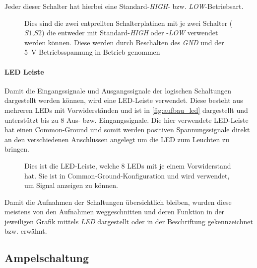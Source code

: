 \documentclass[12pt,english,ngerman]{scrartcl}
\begin{document}
Jeder dieser Schalter hat hierbei eine Standard-\textit{HIGH}- bzw.
\textit{LOW}-Betriebsart.

\begin{figure}[H]
  \centering
  \caption{Dies sind die zwei entprellten Schalterplatinen mit je zwei Schalter
    ($S1$,$S2$) die entweder mit Standard-\textit{HIGH} oder -\textit{LOW} verwendet
    werden können. Diese werden durch Beschalten des \textit{GND} und der \SI{5}{\volt}
    Betriebsspannung in Betrieb genommen}
  \label{fig:aufbau_schalter}
\end{figure}


\paragraph{LED Leiste}
Damit die Eingangssignale und Ausgangssignale der logischen Schaltungen
dargestellt werden können, wird eine LED-Leiste verwendet. Diese besteht aus
mehreren LEDs mit Vorwiderständen und ist in \autoref{fig:aufbau_led} dargestellt und
unterstützt bis zu 8 Aus- bzw. Eingangssignale. Die hier verwendete LED-Leiste
hat einen Common-Ground und somit werden positiven Spannungssignale direkt an den
verschiedenen Anschlüssen angelegt um die LED zum Leuchten zu bringen.

\begin{figure}[H]
  \centering
  \caption{Dies ist die LED-Leiste, welche 8 LEDs mit je einem Vorwiderstand
  hat. Sie ist in Common-Ground-Konfiguration und wird verwendet, um Signal
  anzeigen zu können.}
  \label{fig:aufbau_led}
\end{figure}

Damit die Aufnahmen der Schaltungen übersichtlich bleiben, wurden diese meistens
von den Aufnahmen weggeschnitten und deren Funktion in der jeweiligen Grafik
mittels \textit{LED} dargestellt oder in der Beschriftung gekennzeichnet bzw.
erwähnt.


\subsection{Ampelschaltung}
\end{document}
